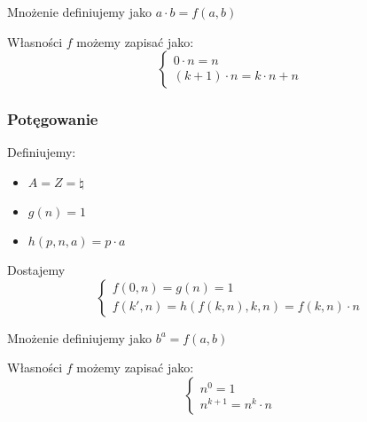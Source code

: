 Mnożenie definiujemy jako \( a \cdot b = f(a, b) \)

Własności \( f \) możemy zapisać jako:
\[
    \begin{cases}
        0 \cdot n = n \\
        (k + 1) \cdot n = k \cdot n + n
    \end{cases}
\]

\subsubsection{Potęgowanie}
Definiujemy:
\begin{itemize}
    \item \( A = Z = \natural \)
    \item \( g(n) = 1 \)
    \item \( h(p, n, a) = p \cdot a \)
\end{itemize}

Dostajemy
\[
    \begin{cases}
        f(0, n) = g(n) = 1 \\
        f(k', n) = h(f(k, n), k, n) = f(k, n) \cdot n
    \end{cases}
\]

Mnożenie definiujemy jako \( b^a = f(a, b) \)

Własności \( f \) możemy zapisać jako:
\[
    \begin{cases}
        n^0 = 1 \\
        n^{k + 1} = n^k \cdot n
    \end{cases}
\]
